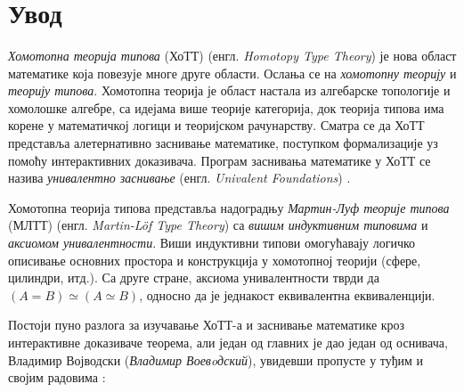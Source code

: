\documentclass[12pt,oneside]{memoir}
\begin{document}
\frontmatter\

\naslovna\

\komisija\


\apstrakt\

\tableofcontents*

\mainmatter\

\chapter{Увод}

\emph{Хомотопна теорија типова} (ХоТТ) (енгл. \emph{Homotopy Type Theory}) је нова област математике која повезује многе друге области. Ослања се на \emph{хомотопну теорију} и \emph{теорију типова}. Хомотопна теорија је област настала из алгебарске топологије и хомолошке алгебре, са идејама више теорије категорија, док теорија типова има корене у математичкој логици и теоријском рачунарству. Сматра се да ХоТТ представља алетернативно заснивање математике, поступком формализације уз помоћу интерактивних доказивача. Програм заснивања математике у ХоТТ се назива \emph{унивалентно заснивање} (енгл. \emph{Univalent Foundations}) \cite{hottbook}. 

Хомотопна теорија типова представља надоградњу \emph{Мартин-Луф теорије типова} (МЛТТ) (енгл. \emph{Martin-Löf Type Theory}) са \emph{вишим индуктивним типовима} и \emph{аксиомом унивалентности}. Виши индуктивни типови омогућавају логичко описивање основних простора и конструкција у хомотопној теорији (сфере, цилиндри, итд.). Са друге стране, аксиома унивалентности тврди да $(A = B) \simeq (A \simeq B)$, односно да је једнакост еквивалентна еквиваленцији.

Постоји пуно разлога за изучавање ХоТТ-а и заснивање математике кроз интерактивне доказиваче теорема, али један од главних је дао један од оснивача, Владимир Војводски (\emph{Владимир Воевoдский}), увидевши пропусте у туђим и својим радовима \cite{vlad14}:
\end{document}
